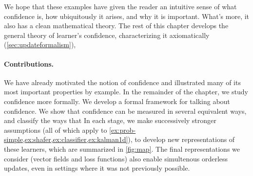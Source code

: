 We hope that these examples have given the reader an intuitive sense of what confidence is, how ubiquitously it arises, and why it is important.
What's more, it also has a clean mathematical theory.
The rest of this chapter develops the general theory of learner's confidence,
    characterizing it axiomatically (\cref{sec:updateformalism}), 
	
	

\paragraph{Contributions.}
We have already motivated the notion of confidence and illustrated many of its most important properties by example.
In the remainder of the chapter, we study confidence more formally. 
We develop a formal framework for talking about confidence.
We show that confidence can be measured in several equivalent ways, and classify the ways that 
In each stage, we make successively stronger assumptions (all of which apply to \cref{ex:prob-simple,ex:shafer,ex:classifier,ex:kalman1d}), to develop new representations of these learners, 
which are summarized in \cref{fig:map}.
The final representations we consider (vector fields and loss functions) also enable simultenous orderless updates, even in settings where it was not previously possible. 





